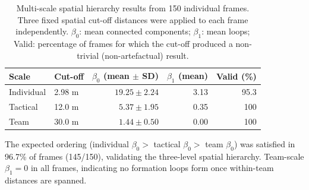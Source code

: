 \documentclass[11pt,a4paper]{article}
\begin{document}
\begin{table}[H]
\centering
\caption{Multi-scale spatial hierarchy results from 150
  individual frames.  Three fixed spatial cut-off distances
  were applied to each frame independently.  \(\beta_0\):
  mean connected components; \(\beta_1\): mean loops;
  Valid: percentage of frames for which the cut-off
  produced a non-trivial (non-artefactual) result.}
\label{tab:hierarchy}
\begin{threeparttable}
\begin{tabular}{@{}llrrr@{}}
\toprule
Scale      & Cut-off & \(\beta_0\) (mean \(\pm\) SD) & \(\beta_1\) (mean) & Valid (\%) \\
\midrule
Individual & 2.98 m  & \(19.25 \pm 2.24\) & 3.13 & 95.3 \\
Tactical   & 12.0 m  & \(5.37  \pm 1.95\) & 0.35 & 100  \\
Team       & 30.0 m  & \(1.44  \pm 0.50\) & 0.00 & 100  \\
\bottomrule
\end{tabular}
\begin{tablenotes}
\small
\item The expected ordering (individual \(\beta_0 >\)
  tactical \(\beta_0 >\) team \(\beta_0\)) was satisfied
  in 96.7\% of frames (145/150), validating the
  three-level spatial hierarchy.
  Team-scale \(\beta_1 = 0\) in all frames, indicating
  no formation loops form once within-team distances
  are spanned.
\end{tablenotes}
\end{threeparttable}
\end{table}
\end{document}
